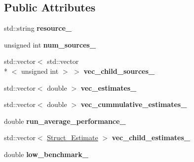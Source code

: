 \subsection*{Public Attributes}
\begin{DoxyCompactItemize}
\item 
\hypertarget{structStruct__Estimate_a7866b20f273f4bbe7ce2645c5b434a35}{std\-::string {\bfseries resource\-\_\-}}\label{structStruct__Estimate_a7866b20f273f4bbe7ce2645c5b434a35}

\item 
\hypertarget{structStruct__Estimate_a24bdea270a40349a809470af81bafb0e}{unsigned int {\bfseries num\-\_\-sources\-\_\-}}\label{structStruct__Estimate_a24bdea270a40349a809470af81bafb0e}

\item 
\hypertarget{structStruct__Estimate_adabb78baf36f2ef0bc0d0e8e04828b97}{std\-::vector$<$ std\-::vector\\*
$<$ unsigned int $>$ $>$ {\bfseries vec\-\_\-child\-\_\-sources\-\_\-}}\label{structStruct__Estimate_adabb78baf36f2ef0bc0d0e8e04828b97}

\item 
\hypertarget{structStruct__Estimate_a0b0945a15f4acdd71673c1d1e45b567a}{std\-::vector$<$ double $>$ {\bfseries vec\-\_\-estimates\-\_\-}}\label{structStruct__Estimate_a0b0945a15f4acdd71673c1d1e45b567a}

\item 
\hypertarget{structStruct__Estimate_a897b46cd85b87c27a982bf18186c9f64}{std\-::vector$<$ double $>$ {\bfseries vec\-\_\-cummulative\-\_\-estimates\-\_\-}}\label{structStruct__Estimate_a897b46cd85b87c27a982bf18186c9f64}

\item 
\hypertarget{structStruct__Estimate_a85fe5ddb41f66097b960f2f715cc82c4}{double {\bfseries run\-\_\-average\-\_\-performance\-\_\-}}\label{structStruct__Estimate_a85fe5ddb41f66097b960f2f715cc82c4}

\item 
\hypertarget{structStruct__Estimate_a94dbf41446b7bad1f8c161c16e9f22c1}{std\-::vector$<$ \hyperlink{structStruct__Estimate}{Struct\-\_\-\-Estimate} $>$ {\bfseries vec\-\_\-child\-\_\-estimates\-\_\-}}\label{structStruct__Estimate_a94dbf41446b7bad1f8c161c16e9f22c1}

\item 
\hypertarget{structStruct__Estimate_a39eecaa17793e0813cdb89338ed794f3}{double {\bfseries low\-\_\-benchmark\-\_\-}}\label{structStruct__Estimate_a39eecaa17793e0813cdb89338ed794f3}


\end{DoxyCompactItemize}
